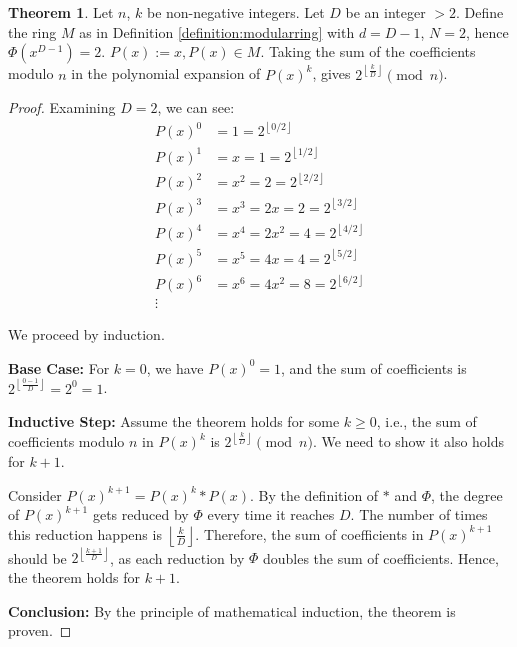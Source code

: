 \documentclass{article}
\theoremstyle{plain}
\theoremstyle{definition}
\newtheorem{theorem}{Theorem}
\begin{document}
\begin{theorem} \label{theorem:2}
Let $n$, $k$ be non-negative integers. Let $D$ be an integer $>2$. Define the ring $M$ as in Definition \ref{definition:modularring} with $d=D-1$, $N=2$, hence $\Phi(x^{D-1}) = 2$. $P(x) := x, P(x) \in M$. Taking the sum of the coefficients modulo $n$ in the polynomial expansion of \( P(x)^k \), gives $2^{\left\lfloor \frac{k}{D} \right\rfloor} \pmod{n}$.
\end{theorem}
\begin{proof}
Examining $D = 2$, we can see:
\begin{align*}
P(x)^0 &= 1 = 2^{\left\lfloor 0/2 \right\rfloor} \\
P(x)^1 &= x = 1 = 2^{\left\lfloor 1/2 \right\rfloor} \\
P(x)^2 &= x^2 = 2 = 2^{\left\lfloor 2/2 \right\rfloor}\\
P(x)^3 &= x^3 = 2x = 2 = 2^{\left\lfloor 3/2 \right\rfloor}\\
P(x)^4 &= x^4 = 2x^2 = 4 = 2^{\left\lfloor 4/2 \right\rfloor}\\
P(x)^5 &= x^5 = 4x = 4 = 2^{\left\lfloor 5/2 \right\rfloor}\\
P(x)^6 &= x^6 = 4x^2 = 8 = 2^{\left\lfloor 6/2 \right\rfloor}\\
\vdots
\end{align*}

We proceed by induction.

\textbf{Base Case:}
For \( k = 0 \), we have \( P(x)^0 = 1 \), and the sum of coefficients is \( 2^{\left\lfloor \frac{0-1}{D} \right\rfloor} = 2^{0} = 1 \).

\textbf{Inductive Step:}
Assume the theorem holds for some \( k \geq 0 \), i.e., the sum of coefficients modulo \( n \) in \( P(x)^k \) is \( 2^{\left\lfloor \frac{k}{D} \right\rfloor} \pmod{n} \). We need to show it also holds for \( k+1 \).

Consider \( P(x)^{k+1} = P(x)^k \ast P(x) \). By the definition of \( \ast \) and \( \Phi \), the degree of \( P(x)^{k+1} \) gets reduced by \( \Phi \) every time it reaches \( D \). The number of times this reduction happens is \( \left\lfloor \frac{k}{D} \right\rfloor \). Therefore, the sum of coefficients in \( P(x)^{k+1} \) should be \( 2^{\left\lfloor \frac{k+1}{D} \right\rfloor} \), as each reduction by \( \Phi \) doubles the sum of coefficients. Hence, the theorem holds for \( k+1 \).

\textbf{Conclusion:}
By the principle of mathematical induction, the theorem is proven.
\end{proof}
\end{document}
